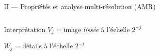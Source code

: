 \documentclass[10pt]{beamer}
\begin{document}
\begin{frame}{II — Propriétés et analyse multi-résolution (AMR)}
\begin{columns}[T]
			\medskip
			\begin{block}{Interprétation}
				$V_j$ = image \emph{lissée} à l'échelle $2^{-j}$\par
				$W_j$ = détails à l'échelle $2^{-j}$\\
				
				
			\end{block}
			
		\end{columns}
		
	\end{frame}
	
	
\end{document}
